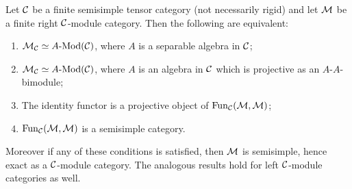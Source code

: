\documentclass{amsart}
\begin{document}
\begin{theorem} \label{thm:SepModCats}
	Let $\mathcal C$ be a finite semisimple tensor category (not necessarily rigid) and let $\mathcal M$ be a finite right $\mathcal C$-module category. Then the following are equivalent:
	\begin{enumerate}
		\item $\cM_\cC \simeq \Mod{A}{}(\cC)$, where $A$ is a separable algebra in $\mathcal C$;
		\item $\cM_\cC \simeq \Mod{A}{}(\cC)$, where $A$ is an algebra in $\mathcal C$ which is projective as an $A$-$A$-bimodule;
		\item The identity functor is a projective object of $\operatorname{Fun}_\mathcal C(\mathcal M, \mathcal M)$;
		\item $\operatorname{Fun}_\mathcal C(\mathcal M, \mathcal M)$ is a semisimple category. 
	\end{enumerate}
	Moreover if any of these conditions is satisfied, then $\mathcal M$ is semisimple, hence exact as a $\mathcal C$-module category. The analogous results hold for left $\mathcal C$-module categories as well. 
\end{theorem}
\end{document}
